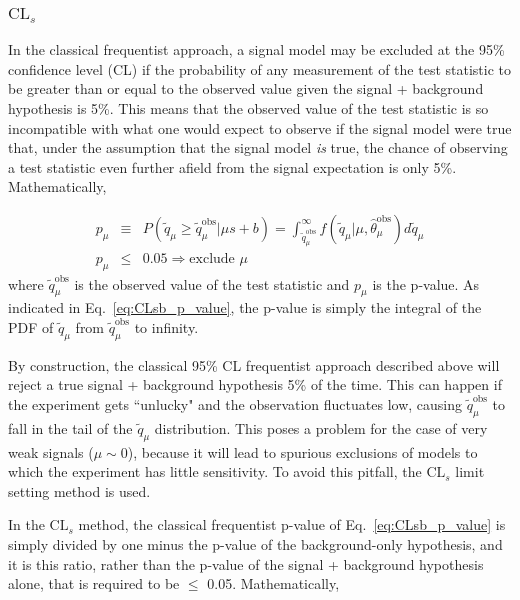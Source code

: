 \documentclass[dissertation.tex]{subfiles}
\begin{document}
\subsubsection{$\mbox{CL}_{s}$}
\label{sec:CLs}

In the classical frequentist approach, a signal model may be excluded at the 95\% confidence level (CL) if the probability of any measurement of the test statistic to be greater than or equal to the observed value given the signal + background hypothesis is 5\%.  This means that the observed value of the test statistic is so incompatible with what one would expect to observe if the signal model were true that, under the assumption that the signal model \textit{is} true, the chance of observing a test statistic even further afield from the signal expectation is only 5\%.  Mathematically, 

\begin{eqnarray}
\label{eq:CLsb_p_value}
p_{\mu} &\equiv& P(\tilde{q}_{\mu} \geq \tilde{q}_{\mu}^{\mathrm{obs}} | \mu s + b) = \int_{\tilde{q}_{\mu}^{\mathrm{obs}}}^{\infty} f(\tilde{q}_{\mu} | \mu, \hat{\theta}_{\mu}^{\mathrm{obs}}) d\tilde{q}_{\mu} \\
p_{\mu} &\leq& 0.05 \Rightarrow \mbox{exclude }\mu \nonumber
\end{eqnarray}
%
where $\tilde{q}_{\mu}^{\mathrm{obs}}$ is the observed value of the test statistic and $p_{\mu}$ is the p-value.  As indicated in Eq.~\ref{eq:CLsb_p_value}, the p-value is simply the integral of the PDF of $\tilde{q}_{\mu}$ from $\tilde{q}_{\mu}^{\mathrm{obs}}$ to infinity.

By construction, the classical 95\% CL frequentist approach described above will reject a true signal + background hypothesis 5\% of the time.  This can happen if the experiment gets ``unlucky" and the observation fluctuates low, causing $\tilde{q}_{\mu}^{\mathrm{obs}}$ to fall in the tail of the $\tilde{q}_{\mu}$ distribution.  This poses a problem for the case of very weak signals ($\mu \sim 0$), because it will lead to spurious exclusions of models to which the experiment has little sensitivity.  To avoid this pitfall, the $\mbox{CL}_{s}$ limit setting method is used.

In the $\mbox{CL}_{s}$ method, the classical frequentist p-value of Eq.~\ref{eq:CLsb_p_value} is simply divided by one minus the p-value of the background-only hypothesis, and it is this ratio, rather than the p-value of the signal + background hypothesis alone, that is required to be $\leq$ 0.05.  Mathematically, 
\end{document}
